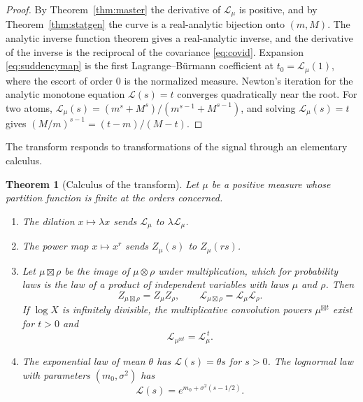 \documentclass[sn-mathphys-num]{sn-jnl}\newcommand{\SNJNL}{}
\theoremstyle{thmstyleone}
\newtheorem{theorem}{Theorem}
\theoremstyle{thmstyletwo}
\theoremstyle{thmstylethree}
\theoremstyle{thmstyleone}
\providecommand{\Leh}{\mathscr{L}}
\begin{document}
	\begin{proof}
		By Theorem~\ref{thm:master} the derivative of $\Leh_\mu$ is
		positive, and by Theorem~\ref{thm:statgen} the curve is a
		real-analytic bijection onto $(m,M)$. The analytic inverse function
		theorem gives a real-analytic inverse, and the derivative of the
		inverse is the reciprocal of the covariance \eqref{eq:covid}. Expansion
		\eqref{eq:suddencymap} is the first Lagrange--B\"urmann coefficient
		at $t_0=\Leh_\mu(1)$, where the escort of order $0$ is the
		normalized measure. Newton's iteration for the analytic monotone equation $\Leh(s)=t$
		converges quadratically near the root.
		For two atoms, $\Leh_\mu(s)=(m^{s}+M^{s})/(m^{s-1}+M^{s-1})$, and
		solving $\Leh_\mu(s)=t$ gives $(M/m)^{s-1}=(t-m)/(M-t)$.
	\end{proof}
	
	The transform responds to transformations of the signal through an
	elementary calculus.
	
	\begin{theorem}[Calculus of the transform]\label{thm:calculus}
		Let $\mu$ be a positive measure whose partition function is finite
		at the orders concerned.
		\begin{enumerate}[label=\textup{(\roman*)},leftmargin=2.2em]
			\item The dilation $x\mapsto\lambda x$ sends $\Leh_\mu$ to
			$\lambda\Leh_\mu$.
			\item The power map $x\mapsto x^{r}$ sends $Z_\mu(s)$ to $Z_\mu(rs)$.
			\item Let $\mu\boxtimes\rho$ be the image of $\mu\otimes\rho$ under
			multiplication, which for probability laws is the law of a
			product of independent variables with laws $\mu$ and $\rho$.
			Then
			\begin{equation}\label{eq:character}
				Z_{\mu\boxtimes\rho}=Z_\mu Z_\rho,
				\qquad
				\Leh_{\mu\boxtimes\rho}=\Leh_\mu\Leh_\rho .
			\end{equation}
			If $\log X$ is infinitely divisible, the multiplicative
			convolution powers $\mu^{\boxtimes t}$ exist for $t>0$ and
			\begin{equation}\label{eq:power}
				\Leh_{\mu^{\boxtimes t}}=\Leh_\mu^{\,t}.
			\end{equation}
			\item The exponential law of mean $\theta$ has $\Leh(s)=\theta s$ for
			$s>0$.
			The lognormal law with parameters $(m_0,\sigma^{2})$ has
			\begin{equation}\label{eq:lognormalcurve}
				\Leh(s)=e^{m_0+\sigma^{2}(s-1/2)} .
			\end{equation}
		\end{enumerate}
	\end{theorem}
	
\end{document}
